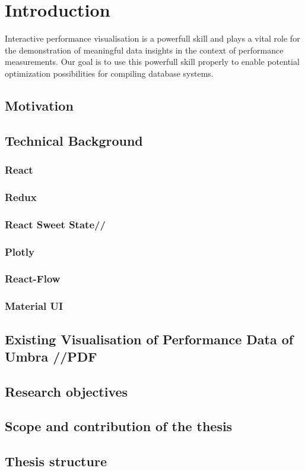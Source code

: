 
\chapter{Introduction}\label{chapter:introduction}
Interactive performance visualisation is a powerfull skill and plays a vital role for the demonstration of meaningful data insights in the context of performance measurements. Our goal is to use this powerfull skill properly to enable potential optimization possibilities for compiling database systems.

\section{Motivation}
\section{Technical Background}
\subsection{React}
\subsection{Redux}
\subsection{React Sweet State//}
\subsection{Plotly}
\subsection{React-Flow}
\subsection{Material UI}
\section{Existing Visualisation of Performance Data of Umbra //PDF }
\section{Research objectives}
\section{Scope and contribution of the thesis}
\section{Thesis structure}

